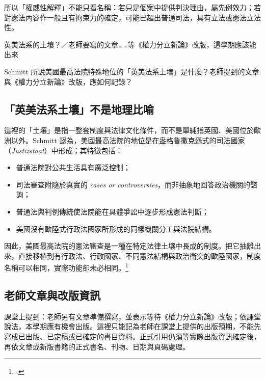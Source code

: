 所以「權威性解釋」不能只看名稱：若只是個案中提供判決理由，屬先例效力；若對憲法內容作一般且有拘束力的確定，可能已超出普通司法，具有立法或憲法立法性。


\begin{qaprompt}
英美法系的土壤？／老師要寫的文章\ldots\ldots 等《權力分立新論》改版，這學期應該能出來
\end{qaprompt}

\begin{qaquestion}
Schmitt 所說美國最高法院特殊地位的「英美法系土壤」是什麼？老師提到的文章與《權力分立新論》改版，應如何記錄？
\end{qaquestion}

\subsection{「英美法系土壤」不是地理比喻}

這裡的「土壤」是指一整套制度與法律文化條件，而不是單純指英國、美國位於歐洲以外。Schmitt 認為，美國最高法院的地位是在盎格魯撒克遜式的司法國家（\emph{Justizstaat}）中形成；其特徵包括：

\begin{itemize}
\tightlist
\item
  普通法院對公共生活具有廣泛控制；
\item
  司法審查附隨於真實的 \emph{cases or controversies}，而非抽象地回答政治機關的諮詢；
\item
  普通法與判例傳統使法院能在具體爭訟中逐步形成憲法判斷；
\item
  美國沒有歐陸式行政法國家所形成的同樣機關分工與法院結構。
\end{itemize}

因此，美國最高法院的憲法審查是一種在特定法律土壤中長成的制度。把它抽離出來，直接移植到有行政法、行政國家、不同憲法結構與政治衝突的歐陸國家，制度名稱可以相同，實際功能卻未必相同。\footcites[80--82]{schmitt2015}[12--14]{schmitt1931}

\subsection{老師文章與改版資訊}

課堂上提到：老師另有文章準備撰寫，並表示等待《權力分立新論》改版；依課堂說法，本學期應有機會出版。這裡只能記為老師在課堂上提供的出版預期，不能先寫成已出版、已定稿或已確定的書目資料。正式引用仍須等實際出版資訊確定後，再依文章或新版書籍的正式書名、刊物、日期與頁碼處理。

